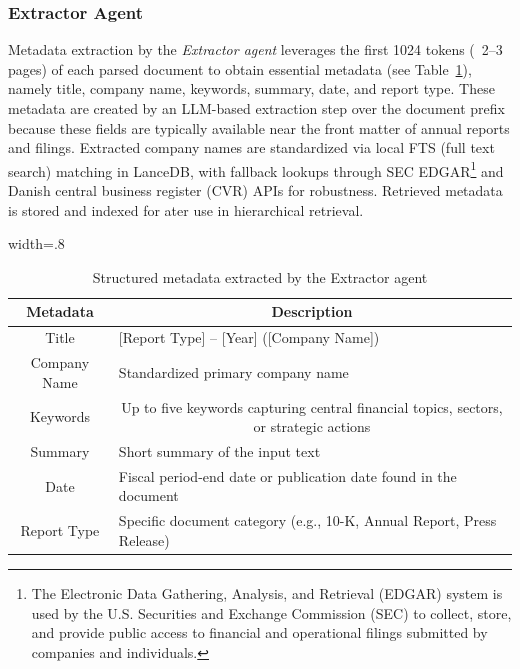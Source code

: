 \documentclass[final,5p,times,twopage,twocolumn,a4paper]{elsarticle}
\begin{document}
\subsubsection{Extractor Agent}
Metadata extraction by the \textit{Extractor agent} leverages the first 1024 tokens (~2–3 pages) of each parsed document to obtain essential metadata (see Table~\ref{tab:metadata}), namely title, company name, keywords, summary, date, and report type. These metadata are created by an LLM-based extraction step over the document prefix because these fields are typically available near the front matter of annual reports and filings. Extracted company names are standardized via local FTS (full text search) matching in LanceDB, with fallback lookups through SEC EDGAR\footnote{The Electronic Data Gathering, Analysis, and Retrieval (EDGAR) system is used by the U.S. Securities and Exchange Commission (SEC) to collect, store, and provide public access to financial and operational filings submitted by companies and individuals.} and Danish central business register (CVR) APIs for robustness. Retrieved metadata is stored and indexed for ater use in hierarchical retrieval.
%
\begin{table}[!hbt]
\centering
\caption{Structured metadata extracted by the Extractor agent}
\label{tab:metadata}
\begin{adjustbox}{width=.8\textwidth}
\begin{tabular}{|c|l|}
\hline
\textbf{Metadata} & \multicolumn{1}{c|}{\textbf{Description}}                                                                  \\ \hline
Title             & [Report Type] – [Year] ([Company Name])                                                                    \\ \hline
Company Name      & Standardized primary company name                                                                          \\ \hline
Keywords          & \multicolumn{1}{c|}{Up to five keywords capturing central financial topics, sectors, or strategic actions} \\ \hline
Summary           & Short summary of the input text                                                                            \\ \hline
Date              & Fiscal period-end date or publication date found in the document                                           \\ \hline
Report Type       & Specific document category (e.g., 10-K, Annual Report, Press Release)                                      \\ \hline
\end{tabular}
\end{adjustbox}
\end{table}
%
\end{document}

